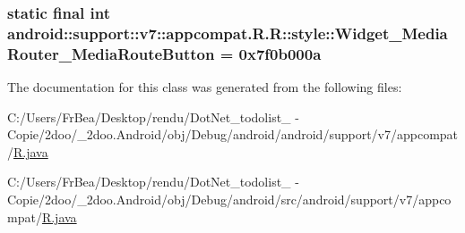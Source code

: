 \hypertarget{classandroid_1_1support_1_1v7_1_1appcompat_1_1_r_1_1style_ef996fd684083cddad128d750c746108}{
\subsubsection[{Widget\_\-MediaRouter\_\-MediaRouteButton}]{\setlength{\rightskip}{0pt plus 5cm}static final int android::support::v7::appcompat.R.R::style::Widget\_\-MediaRouter\_\-MediaRouteButton = 0x7f0b000a}}
\label{classandroid_1_1support_1_1v7_1_1appcompat_1_1_r_1_1style_ef996fd684083cddad128d750c746108}




The documentation for this class was generated from the following files:\begin{CompactItemize}
\item 
C:/Users/FrBea/Desktop/rendu/DotNet\_\-todolist\_ - Copie/2doo/\_\-2doo.Android/obj/Debug/android/android/support/v7/appcompat/\hyperlink{android_2support_2v7_2appcompat_2_r_8java}{R.java}\item 
C:/Users/FrBea/Desktop/rendu/DotNet\_\-todolist\_ - Copie/2doo/\_\-2doo.Android/obj/Debug/android/src/android/support/v7/appcompat/\hyperlink{src_2android_2support_2v7_2appcompat_2_r_8java}{R.java}\end{CompactItemize}

